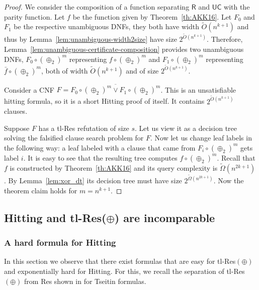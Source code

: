 \documentclass[11pt]{article}
\newcommand{\scterm}[1]{{\textrm{\sc #1}}}
\newcommand{\hit}{\scterm{Hitting}}
\newcommand{\tres}{\scterm{tl-Res}}
\newcommand{\res}{\scterm{Res}}
\newcommand{\tresp}{{\tres}$(\oplus)$}
\newcommand{\ucert}{\mathsf{UC}}
\newcommand{\R}{\mathsf{R}}
\numberwithin{equation}{section}
\begin{document}
\begin{proof}
We consider the composition of a function separating $\R$ and $\ucert$ with the parity function.
Let $f$ be the function given by Theorem~\ref{th:AKK16}. Let $F_0$ and $F_1$ be the respective unambiguous DNFs, they both have width $\tilde{O}(n^{k+1})$ and thus by Lemma~\ref{lem:unambiguous-width2size} have size $2^{\tilde{O}(n^{k+1})}$. Therefore, 
Lemma~\ref{lem:unambiguous-certificate-composition} provides two unambiguous DNFs, $F_0 \circ (\oplus_2)^m$ representing $f \circ (\oplus_2)^m$ and $F_1 \circ (\oplus_2)^m$ representing $\bar{f} \circ (\oplus_2)^m$, both of width $\tilde{O}(n^{k+1})$ and of size $2^{\tilde{O}(n^{k+1})}$.

\vspace{2mm}
Consider a CNF $F = \overline{F_0 \circ (\oplus_2)^m \lor F_1 \circ (\oplus_2)^m}$.
This is an unsatisfiable hitting formula, so it is a short {\hit} proof of itself.
It contains $2^{\tilde{O}(n^{k+1})}$ clauses.

\vspace{2mm}
Suppose $F$ has a {\tres} refutation of size $s$. Let us view it as a decision tree solving the falsified clause search problem for $F$. Now let us change leaf labels in the following way: a leaf labeled with a clause that came from $F_i \circ (\oplus_2)^m$ gets label $i$. It is easy to see that the resulting tree computes $f \circ (\oplus_2)^m$. Recall that $f$ is constructed by Theorem~\ref{th:AKK16} and its query complexity is $\tilde{\Omega}(n^{2k+1})$. By Lemma~\ref{lem:xor_dt} its decision tree must have size $2^{\tilde{\Omega}(n^{2k+1})}$. Now the theorem claim holds for $m=n^{k+1}$.
\end{proof}

\subsection{{\hit} and {\tres}(\texorpdfstring{$\oplus$}{⊕}) are incomparable}
\label{sec:linear-hitting-vs-tree-like-resolution}

\subsubsection{A hard formula for {\hit}}
\label{sec:hitting-xor-vs-resolution}

In this section we observe that there exist formulas that are easy for {\tresp} and exponentially hard for {\hit}. For this, we recall the separation of {\tresp} from {\res} shown in \cite{IS20} for Tseitin formulas.
\end{document}
